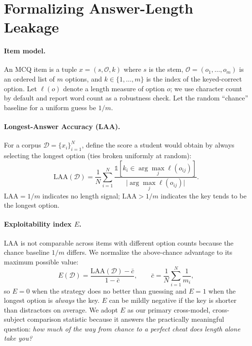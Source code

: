 \documentclass[10pt,twocolumn]{article}
\begin{document}
\section{Formalizing Answer-Length Leakage}
\label{sec:metrics}

\paragraph{Item model.} An MCQ item is a tuple
$x=(s,\mathcal{O},k)$ where $s$ is the stem, $\mathcal{O}=(o_1,\dots,o_m)$ is
an ordered list of $m$ options, and $k\in\{1,\dots,m\}$ is the index of the
keyed-correct option. Let $\ell(o)$ denote a length measure of option $o$; we
use character count by default and report word count as a robustness check.
Let the random ``chance'' baseline for a uniform guess be $1/m$.

\paragraph{Longest-Answer Accuracy (LAA).} For a corpus
$\mathcal{D}=\{x_i\}_{i=1}^{N}$, define the score a student would obtain by
always selecting the longest option (ties broken uniformly at random):
\begin{equation}
\mathrm{LAA}(\mathcal{D})=\frac{1}{N}\sum_{i=1}^{N}
\frac{\mathbb{1}\!\left[k_i\in \arg\max_{j}\ell(o_{ij})\right]}
{\bigl|\arg\max_{j}\ell(o_{ij})\bigr|}.
\label{eq:laa}
\end{equation}
$\mathrm{LAA}=1/m$ indicates no length signal; $\mathrm{LAA}>1/m$ indicates the
key tends to be the longest option.

\paragraph{Exploitability index $E$.} LAA is not comparable across items with
different option counts because the chance baseline $1/m$ differs. We normalize
the above-chance advantage to its maximum possible value:
\begin{equation}
E(\mathcal{D})=\frac{\mathrm{LAA}(\mathcal{D})-\bar{c}}{1-\bar{c}},
\qquad \bar{c}=\frac{1}{N}\sum_{i=1}^{N}\frac{1}{m_i},
\label{eq:expl}
\end{equation}
so $E=0$ when the strategy does no better than guessing and $E=1$ when the
longest option is \emph{always} the key. $E$ can be mildly negative if the key
is shorter than distractors on average. We adopt $E$ as our primary
cross-model, cross-subject comparison statistic because it answers the
practically meaningful question: \emph{how much of the way from chance to a
perfect cheat does length alone take you?}
\end{document}
